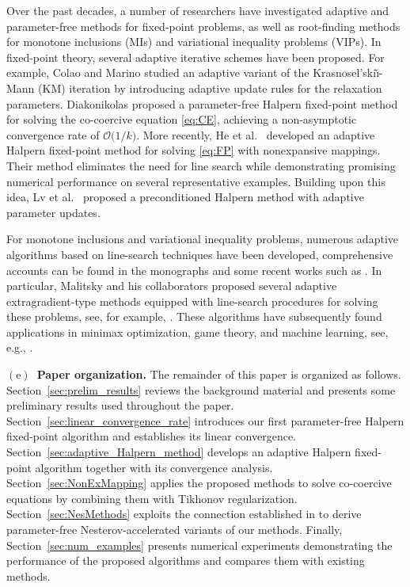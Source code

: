 \documentclass{article}
\theoremstyle{plain}
\theoremstyle{definition}
\newcommand{\0}{\boldsymbol{0}}
\newcommand{\BigOs}[1]{\mathcal{O}\big(#1\big)}
\begin{document}
Over the past decades, a number of researchers have investigated adaptive and parameter-free methods for fixed-point problems, as well as root-finding methods for monotone inclusions (MIs) and variational inequality problems (VIPs). 
In fixed-point theory, several adaptive iterative schemes have been proposed. 
For example, Colao and Marino \cite{colao2015krasnoselskii} studied an adaptive variant of the Krasnosel'ski\v{\i}-Mann (KM) iteration by introducing adaptive update rules for the relaxation parameters. 
Diakonikolas \cite{diakonikolas2020halpern} proposed a parameter-free Halpern fixed-point method for solving the co-coercive equation \eqref{eq:CE}, achieving a non-asymptotic convergence rate of $\BigOs{1/k}$. 
More recently, He et al.~\cite{he2024convergence} developed an adaptive Halpern fixed-point method for solving \eqref{eq:FP} with nonexpansive mappings. 
Their method eliminates the need for line search while demonstrating promising numerical performance on several representative examples. 
Building upon this idea, Lv et al.~\cite{lv2026preconditioned} proposed a preconditioned Halpern method with adaptive parameter updates.

For monotone inclusions and variational inequality problems, numerous adaptive algorithms based on line-search techniques have been developed, comprehensive accounts can be found in the monographs \cite{Facchinei2003,Konnov2001} and some recent works such as \cite{he2018totally,oyewole2022totally}. 
In particular, Malitsky and his collaborators proposed several adaptive extragradient-type methods equipped with line-search procedures for solving these problems, see, for example, \cite{malitsky2019golden,malitsky2020forward}. 
These algorithms have subsequently found applications in minimax optimization, game theory, and machine learning, see, e.g., \cite{daskalakis2018training,ioan2023relaxed,malitsky2016first}.

\vspace{0.75ex}
\noindent\textbf{$\mathrm{(e)}$~Paper organization.}
The remainder of this paper is organized as follows.
Section~\ref{sec:prelim_results} reviews the background material and presents some preliminary results used throughout the paper.
Section~\ref{sec:linear_convergence_rate} introduces our first parameter-free Halpern fixed-point algorithm and establishes its linear convergence.
Section~\ref{sec:adaptive_Halpern_method} develops an adaptive Halpern fixed-point algorithm together with its convergence analysis.
Section~\ref{sec:NonExMapping} applies the proposed methods to solve co-coercive equations by combining them with Tikhonov regularization.
Section~\ref{sec:NesMethods} exploits the connection established in \cite{tran2022connection} to derive parameter-free Nesterov-accelerated variants of our methods.
Finally, Section~\ref{sec:num_examples} presents numerical experiments demonstrating the performance of the proposed algorithms and compares them with existing methods.
\end{document}
